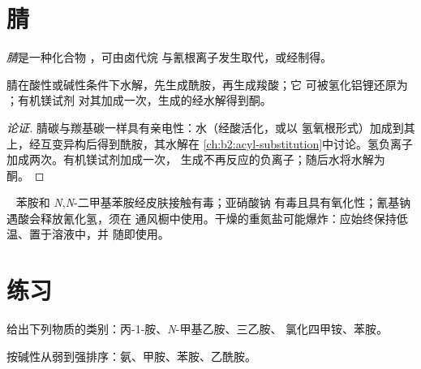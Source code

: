 \section{腈}

\begin{definition}[腈]\label{def:b2:amines:nitrile}
\emph{腈}是一种化合物 ，可由卤代烷
与氰根离子发生取代，或经制得。
\end{definition}

\begin{proposition}[腈的反应]\label{prop:b2:amines:nitrile}
腈在酸性或碱性条件下水解，先生成酰胺，再生成羧酸；它
可被氢化铝锂还原为 ；有机镁试剂
对其加成一次，生成的经水解得到酮。
\end{proposition}

\begin{proof}[论证]
腈碳与羰基碳一样具有亲电性：水（经酸活化，或以
氢氧根形式）加成到其上，经互变异构后得到酰胺，其水解在
\cref{ch:b2:acyl-substitution}中讨论。氢负离子加成两次。有机镁试剂加成一次，
生成不再反应的负离子；随后水将水解为酮。
\end{proof}

\begin{safety}{\,\,\,}
苯胺和 \textit{N},\textit{N}-二甲基苯胺经皮肤接触有毒；亚硝酸钠
有毒且具有氧化性；氰基钠遇酸会释放氰化氢，须在
通风橱中使用。干燥的重氮盐可能爆炸：应始终保持低温、置于溶液中，并
随即使用。
\end{safety}

\section{练习}

\begin{exercise}[$\star$]\label{exo:b2:amines:1}
给出下列物质的类别：丙-1-胺、\textit{N}-甲基乙胺、三乙胺、
氯化四甲铵、苯胺。
\end{exercise}

\begin{exercise}[$\star$]\label{exo:b2:amines:2}
按碱性从弱到强排序：氨、甲胺、苯胺、乙酰胺。
\end{exercise}

